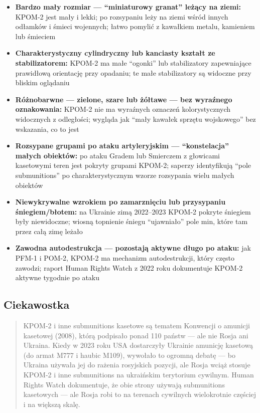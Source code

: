 \documentclass[12pt,oneside]{book}
\providecommand{\tightlist}{%
  \setlength{\itemsep}{0pt}\setlength{\parskip}{0pt}}
\begin{document}
\begin{itemize}
\tightlist
\item
  \textbf{Bardzo mały rozmiar --- ``miniaturowy granat'' leżący na
  ziemi:} KPOM-2 jest mały i lekki; po rozsypaniu leży na ziemi wśród
  innych odłamków i śmieci wojennych; łatwo pomylić z kawałkiem metalu,
  kamieniem lub śmieciem
\item
  \textbf{Charakterystyczny cylindryczny lub kanciasty kształt ze
  stabilizatorem:} KPOM-2 ma małe ``ogonki'' lub stabilizatory
  zapewniające prawidłową orientację przy opadaniu; te małe
  stabilizatory są widoczne przy bliskim oglądaniu
\item
  \textbf{Różnobarwne --- zielone, szare lub żółtawe --- bez wyraźnego
  oznakowania:} KPOM-2 nie ma wyraźnych oznaczeń kolorystycznych
  widocznych z odległości; wygląda jak ``mały kawałek sprzętu
  wojskowego'' bez wskazania, co to jest
\item
  \textbf{Rozsypane grupami po ataku artyleryjskim --- ``konstelacja''
  małych obiektów:} po ataku Gradem lub Smierczem z głowicami kasetowymi
  teren jest pokryty grupami KPOM-2; saperzy identyfikują ``pole
  submunitions'' po charakterystycznym wzorze rozsypania wielu małych
  obiektów
\item
  \textbf{Niewykrywalne wzrokiem po zamarznięciu lub przysypaniu
  śniegiem/błotem:} na Ukrainie zimą 2022--2023 KPOM-2 pokryte śniegiem
  były niewidoczne; wiosną topnienie śniegu ``ujawniało'' pole min,
  które tam przez całą zimę leżało
\item
  \textbf{Zawodna autodestrukcja --- pozostają aktywne długo po ataku:}
  jak PFM-1 i POM-2, KPOM-2 ma mechanizm autodestrukcji, który często
  zawodzi; raport Human Rights Watch z 2022 roku dokumentuje KPOM-2
  aktywne tygodnie po ataku
\end{itemize}

\subsection{Ciekawostka}\label{ciekawostka-132}

\begin{quote}
KPOM-2 i inne submunitions kasetowe są tematem Konwencji o amunicji
kasetowej (2008), którą podpisało ponad 110 państw --- ale nie Rosja ani
Ukraina. Kiedy w 2023 roku USA dostarczyły Ukrainie amunicję kasetową
(do armat M777 i haubic M109), wywołało to ogromną debatę --- bo Ukraina
używała jej do rażenia rosyjskich pozycji, ale Rosja wciąż stosuje
KPOM-2 i inne submunitions na ukraińskim terytorium cywilnym. Human
Rights Watch dokumentuje, że obie strony używają submunitions kasetowych
--- ale Rosja robi to na terenach cywilnych wielokrotnie częściej i na
większą skalę.
\end{quote}
\end{document}
